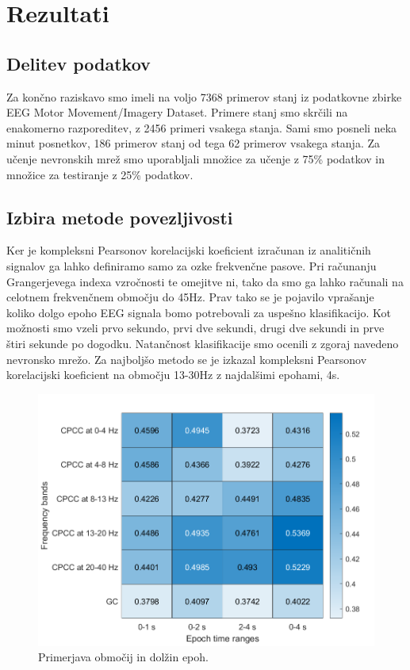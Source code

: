 \chapter{Rezultati}
\section{Delitev podatkov}
Za končno raziskavo smo imeli na voljo 7368 primerov stanj iz podatkovne zbirke EEG Motor Movement/Imagery Dataset. Primere stanj smo skrčili na enakomerno razporeditev, z 2456 primeri vsakega stanja. Sami smo posneli neka minut posnetkov, 186 primerov stanj od tega 62 primerov vsakega stanja. Za učenje nevronskih mrež smo uporabljali množice za učenje z 75\% podatkov in množice za testiranje z 25\% podatkov.

\section{Izbira metode povezljivosti}
Ker je kompleksni Pearsonov korelacijski koeficient izračunan iz analitičnih signalov ga lahko definiramo samo za ozke frekvenčne pasove. Pri računanju Grangerjevega indexa vzročnosti te omejitve ni, tako da smo ga lahko računali na celotnem frekvenčnem območju do 45Hz. Prav tako se je pojavilo vprašanje koliko dolgo epoho EEG signala bomo potrebovali za uspešno klasifikacijo. Kot možnosti smo vzeli prvo sekundo, prvi dve sekundi, drugi dve sekundi in prve štiri sekunde po dogodku. Natančnost klasifikacije smo ocenili z zgoraj navedeno nevronsko mrežo. Za najboljšo metodo se je izkazal kompleksni Pearsonov korelacijski koeficient na območju 13-30Hz z najdalšimi epohami, 4s.
\begin{figure}[h!]
    \begin{center}
    \includegraphics[width=0.5\linewidth]{slike/Comparison.png}
    \end{center}
    \caption{Primerjava območij in dolžin epoh.}
\end{figure}



